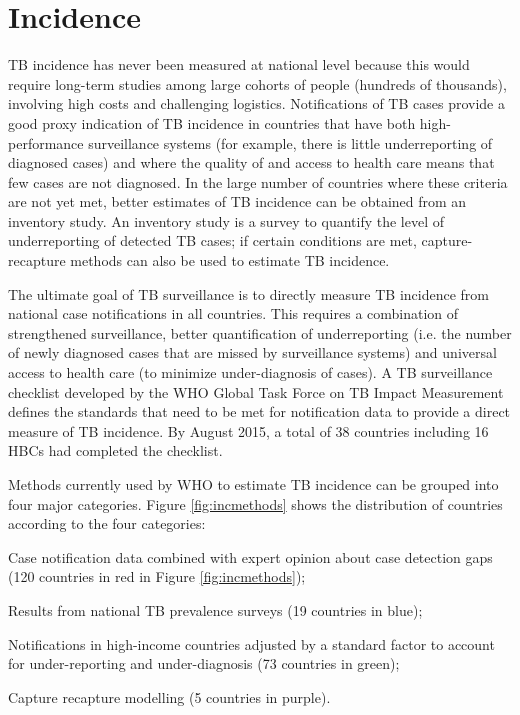 \section{Incidence}

TB incidence has never been measured at national level because this would require long-term studies among large cohorts of people (hundreds of thousands), involving high costs and challenging logistics. Notifications of TB cases provide a good proxy indication of TB incidence in countries that have both high-performance surveillance systems (for example, there is little underreporting of diagnosed cases) and where the quality of and access to health care means that few cases are not diagnosed. In the large number of countries where these criteria are not yet met, better estimates of TB incidence can be obtained from an inventory study. An inventory study is a survey to quantify the level of underreporting of detected TB cases; if certain conditions are met, capture-recapture methods can also be used to estimate TB incidence\cite{WHO2012}. 

The ultimate goal of TB surveillance is to directly measure TB incidence from national case notifications in all countries. This requires a combination of strengthened surveillance, better quantification of underreporting (i.e. the number of newly diagnosed cases that are missed by surveillance systems) and universal access to health care (to minimize under-diagnosis of cases). A TB surveillance checklist developed by the WHO Global Task Force on TB Impact Measurement defines the standards that need to be met for notification data to provide a direct measure of TB incidence\cite{WHO2014}. By August 2015, a total of 38 countries including 16 HBCs had completed the checklist. 

Methods currently used by WHO to estimate TB incidence can be grouped into four major categories. Figure \ref{fig:incmethods} shows the distribution of countries according to the four categories: 

\begin{ennumerate}
\item Case notification data combined with expert opinion about case detection gaps (120 countries in red in Figure \ref{fig:incmethods});
\item Results from national TB prevalence surveys (19 countries in blue);
\item Notifications in high-income countries adjusted by a standard factor to account for under-reporting and under-diagnosis (73 countries in green);
\item Capture recapture modelling (5 countries in purple).
\end{ennumerate}






  
  
  
  
  
  
  
  
  
  